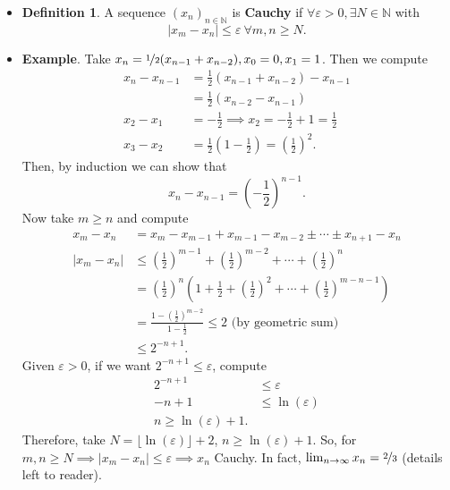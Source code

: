 \documentclass{article}
\newcommand{\N}{\mathbb{N}}
\newcommand{\seq}[2]{(#1_{#2})_{#2 \in \N}}
\newcommand{\?}{\stackrel{?}{=}}
\theoremstyle{definition} %
\newtheorem{definition}[subsection]{Definition} %
\begin{document}
\begin{itemize}
    \item[] 
    \begin{definition}
        A sequence $\seq{x}{n}$ is \textbf{Cauchy} if $\forall \varepsilon > 0, \exists N \in \N$ with
    $$|x_m - x_n| \leq \varepsilon \ \forall m, n \geq N.$$
    \end{definition}
    \item \textbf{Example}. Take $x_n = \nicefrac{1}{2}(x_{n - 1} + x_{n - 2}), x_0 = 0, x_1 = 1$. Then we compute
    \begin{align*}
        x_n - x_{n - 1} &= \frac{1}{2}(x_{n - 1} + x_{n - 2}) - x_{n - 1} \\
        &= \frac{1}{2}(x_{n - 2} - x_{n - 1}) \\
        x_2 - x_1 &= -\frac{1}{2} \implies x_2 = -\frac{1}{2} + 1 = \frac{1}{2} \\
        x_3 - x_2 &= \frac{1}{2}(1 - \frac{1}{2}) = \left(\frac{1}{2}\right)^2.
    \end{align*}
    Then, by induction we can show that
    $$x_n - x_{n - 1} = \left(-\frac{1}{2}\right)^{n - 1}.$$
    Now take $m \geq n$ and compute
    \begin{align*}
        x_m - x_n &= x_m - x_{m - 1} + x_{m - 1} - x_{m - 2} \pm \cdots \pm x_{n + 1} - x_n \\
        |x_m - x_n| &\leq \left(\frac{1}{2}\right)^{m - 1} + \left(\frac{1}{2}\right)^{m - 2} + \cdots + \left(\frac{1}{2}\right)^n \\
        &= \left(\frac{1}{2}\right)^n\left(1 + \frac{1}{2} + \left(\frac{1}{2}\right)^2 + \cdots + \left(\frac{1}{2}\right)^{m - n - 1}\right) \\
        &= \frac{1 - \left(\frac{1}{2}\right)^{m - 2}}{1 - \frac{1}{2}} \leq 2 \text{ (by geometric sum)} \\
        &\leq 2^{-n + 1}.
    \end{align*}
    Given $\varepsilon > 0$, if we want $2^{-n + 1} \leq \varepsilon$, compute
    \begin{align*}
        2^{-n + 1} &\leq \varepsilon \\
        -n + 1 &\leq \ln(\varepsilon) \\
        n \geq \ln(\varepsilon) + 1.
    \end{align*}
    Therefore, take $N = \lfloor \ln(\varepsilon) \rfloor + 2$, $n \geq \ln(\varepsilon) + 1$. So, for $m, n \geq N \implies |x_m - x_n| \leq \varepsilon \implies x_n$ Cauchy. In fact, $\lim_{n \to \infty} x_n = \nicefrac{2}{3}$ (details left to reader). \\\\

\end{itemize}
\end{document}
